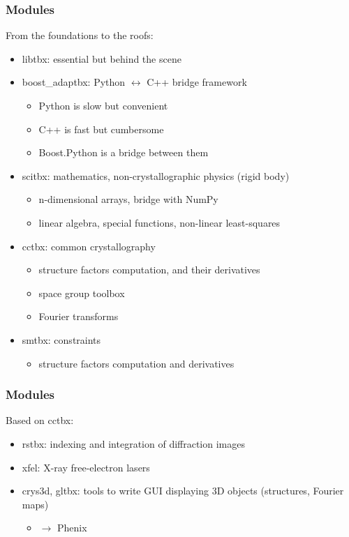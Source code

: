 \documentclass[10pt]{beamer}
\begin{document}
\begin{frame}[fragile]
\frametitle{Modules}
From the foundations to the roofs:
\begin{itemize}
\item libtbx: essential but behind the scene
\item boost\_adaptbx: Python $\leftrightarrow$ C++ bridge framework
\begin{itemize}
\item Python is slow but convenient
\item C++ is fast but cumbersome
\item Boost.Python is a bridge between them
\end{itemize}

\item scitbx: mathematics, non-crystallographic physics (rigid body)
\begin{itemize}
\item n-dimensional arrays, bridge with NumPy
\item linear algebra, special functions, non-linear least-squares
\end{itemize}
\item cctbx: common crystallography
\begin{itemize}
\item structure factors computation, and their derivatives
\item space group toolbox
\item Fourier transforms
\end{itemize}
\item smtbx: constraints
\begin{itemize}
\item structure factors computation and derivatives
\end{itemize}
\end{itemize}
\end{frame}

\begin{frame}[fragile]
\frametitle{Modules}
Based on cctbx:
\begin{itemize}
\item rstbx: indexing and integration of diffraction images
\item xfel: X-ray free-electron lasers
\item crys3d, gltbx: tools to write GUI displaying 3D objects (structures, Fourier maps)
\begin{itemize}
\item $\longrightarrow$ Phenix
\end{itemize}
\end{itemize}
\end{frame}
\end{document}
